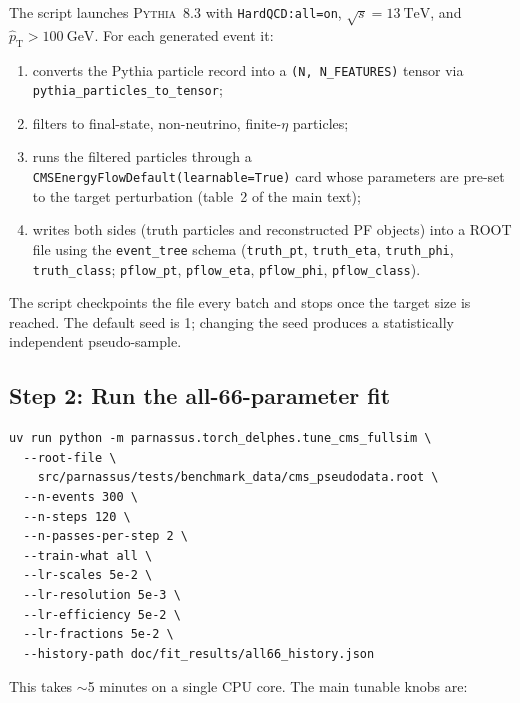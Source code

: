 \documentclass[a4paper,11pt]{article}
\begin{document}
The script launches \textsc{Pythia~8.3} with \texttt{HardQCD:all=on},
$\sqrt{s}=\SI{13}{\TeV}$, and $\hat{p}_\mathrm{T}>\SI{100}{\GeV}$.
For each generated event it:
\begin{enumerate}
\item converts the Pythia particle record into a
      \texttt{(N,\,N\_FEATURES)} tensor
      via \texttt{pythia\_particles\_to\_tensor};
\item filters to final-state, non-neutrino, finite-$\eta$ particles;
\item runs the filtered particles through a
      \texttt{CMSEnergyFlowDefault(learnable=True)} card whose
      parameters are pre-set to the target perturbation (table~2 of
      the main text);
\item writes both sides (truth particles and reconstructed PF objects)
      into a ROOT file using the \texttt{event\_tree} schema
      (\texttt{truth\_pt}, \texttt{truth\_eta}, \texttt{truth\_phi},
      \texttt{truth\_class}; \texttt{pflow\_pt}, \texttt{pflow\_eta},
      \texttt{pflow\_phi}, \texttt{pflow\_class}).
\end{enumerate}

The script checkpoints the file every batch and stops once the target
size is reached. The default seed is 1; changing the seed produces a
statistically independent pseudo-sample.

\subsection{Step 2: Run the all-66-parameter fit}
\label{app:step2}

\begin{verbatim}
uv run python -m parnassus.torch_delphes.tune_cms_fullsim \
  --root-file \
    src/parnassus/tests/benchmark_data/cms_pseudodata.root \
  --n-events 300 \
  --n-steps 120 \
  --n-passes-per-step 2 \
  --train-what all \
  --lr-scales 5e-2 \
  --lr-resolution 5e-3 \
  --lr-efficiency 5e-2 \
  --lr-fractions 5e-2 \
  --history-path doc/fit_results/all66_history.json
\end{verbatim}

This takes $\sim$5 minutes on a single CPU core. The main tunable
knobs are:
\end{document}
